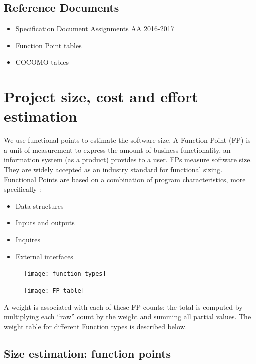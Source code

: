 \documentclass{article}
\begin{document}
\subsection{Reference Documents}
\begin{itemize}
	\item Specification Document Assignments AA 2016-2017
	\item Function Point tables
	\item COCOMO tables
\end{itemize}
\newpage

\section{Project size, cost and effort estimation}
We use functional points to estimate the software size. A Function Point (FP) is a unit of measurement to express the amount of business functionality, an information system (as a product) provides to a user. FPs measure software size. They are widely accepted as an industry standard for functional sizing.\\
Functional Points are based on a combination of program characteristics, more specifically :
\begin{itemize}
	\item Data structures
	\item Inputs and outputs
	\item Inquires
	\item External interfaces
\end{itemize}
	\begin{figure}[h]
	\texttt{[image: function\_types]}
\end{figure}
\begin{figure}[h!]
	\texttt{[image: FP\_table]}
\end{figure}
A weight is associated with each of these FP counts; the total is computed by multiplying each “raw” count by the weight and summing all partial values. The weight table for different Function types is described below.
\newpage
\subsection{Size estimation: function points}
\end{document}

